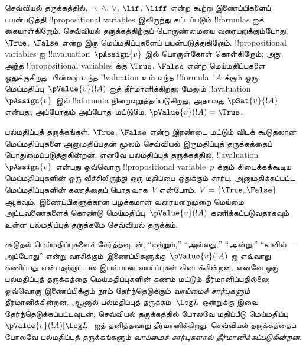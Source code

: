 \documentclass[../../../include/open-logic-section]{subfiles}
\begin{document}


செவ்வியல் தருக்கத்தில், $\lnot$, $\land$, $\lor$, $\lif$, $\liff$ என்ற
கூற்று இணைப்பிகளைப் பயன்படுத்தி !!{propositional variable}s இலிருந்து
கட்டப்படும் !!{formula}s ஐக் கையாள்கிறோம். செவ்வியல் தருக்கத்திற்குப்
பொருண்மையை வரையறுக்கும்போது, $\True$, $\False$ என்ற இரு மெய்மதிப்புகளைப்
பயன்படுத்துகிறோம். !!{propositional variable}s ஐ
!!a{valuation}~$\pAssign{v}$ இல் பொருள்கோள் கொள்கிறோம்; அது அந்த
!!{propositional variable}s க்கு $\True$, $\False$ என்ற மெய்மதிப்புகளை
ஒதுக்குகிறது. பின்னர் எந்த !!{valuation} உம் எந்த
!!{formula}~$!A$ க்கும் ஒரு மெய்மதிப்பு~$\pValue{v}(!A)$ ஐத்
தீர்மானிக்கிறது; மேலும் !!a{valuation}~$\pAssign{v}$ இல் !!a{formula}
நிறைவுறுத்தப்படுகிறது, அதாவது $\pSat{v}{!A}$ என்பது, அப்போதும் அப்போது
மட்டுமே, $\pValue{v}(!A) = \True$.

பல்மதிப்புத் தருக்கங்கள், $\True$, $\False$ என்ற இரண்டை மட்டும் விடக்
கூடுதலான மெய்மதிப்புகளை அனுமதிப்பதன் மூலம் செவ்வியல் இருமதிப்புத்
தருக்கத்தைப் பொதுமைப்படுத்துகின்றன. எனவே பல்மதிப்புத் தருக்கத்தில்,
!!a{valuation}~$\pAssign{v}$ என்பது ஒவ்வொரு !!{propositional
variable}~$p$ க்கும் கிடைக்கக்கூடிய மெய்மதிப்புகளின் ஒரு வீச்சிலிருந்து
ஒரு மதிப்பை ஒதுக்கும் சார்பு. அனுமதிக்கப்பட்ட மெய்மதிப்புகளின் கணத்தைப்
பொதுவாக~$V$ என்போம். $V = \{\True, \False\}$ ஆகவும், இணைப்பிகளுக்கான
பழக்கமான வரையறைமுறை மெய்மை அட்டவணைகளைக் கொண்டு
மெய்மதிப்பு~$\pValue{v}(!A)$ கணிக்கப்படுவதாகவும் உள்ள பல்மதிப்புத்
தருக்கமே செவ்வியல் தருக்கம்.

கூடுதல் மெய்மதிப்புகளைச் சேர்த்தவுடன், ``மற்றும்,'' ``அல்லது,'' ``அன்று,''
``எனில்---அப்போது'' என்று வாசிக்கும் இணைப்பிகளுக்கு~$\pValue{v}(!A)$ ஐ
எவ்வாறு கணிப்பது என்பதற்குப் பல இயல்பான வாய்ப்புகள் கிடைக்கின்றன. எனவே ஒரு
பல்மதிப்புத் தருக்கத்தை மெய்மதிப்புகளின் கணம் மட்டும் தீர்மானிப்பதில்லை;
ஒவ்வொரு இணைப்பிக்கும் நாம் தேர்ந்தெடுக்கும் \emph{வாய்மைச் சார்புகளும்}
தீர்மானிக்கின்றன. ஆனால் பல்மதிப்புத் தருக்கம்~$\Log L$ ஒன்றுக்கு இவை
தேர்ந்தெடுக்கப்பட்டவுடன், செவ்வியல் தருக்கத்தில் போலவே மதிப்பீடு
மெய்மதிப்பு~$\pValue{v}(!A)[\Log L]$ ஐத் தனித்தவாறு தீர்மானிக்கிறது.
செவ்வியல் தருக்கத்தைப் போலவே பல்மதிப்புத் தருக்கங்களும்
\emph{வாய்மைச் சார்புகளால் தீர்மானிக்கப்படுகின்றன}.
\end{document}
